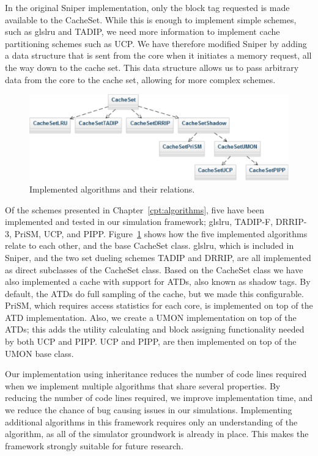 In the original Sniper implementation, only the block tag requested is made available to the CacheSet. 
While this is enough to implement simple schemes, such as gls{lru} and TADIP, we need more information to implement cache partitioning schemes such as UCP.
We have therefore modified Sniper by adding a data structure that is sent from the core when it initiates a memory request, all the way down to the cache set.
This data structure allows us to pass arbitrary data from the core to the cache set, allowing for more complex schemes.

\begin{figure}[ht]
\centering
\includegraphics[scale=0.7]{figures/framework/algorithms}
\caption{Implemented algorithms and their relations.}
\label{fig:framework:implementation:algorithms}
\end{figure}

Of the schemes presented in Chapter~\ref{cpt:algorithms}, five have been implemented and tested in our simulation framework; gls{lru}, TADIP-F, DRRIP-3, PriSM, UCP, and PIPP.
Figure~\ref{fig:framework:implementation:algorithms} shows how the five implemented algorithms relate to each other, and the base CacheSet class.
gls{lru}, which is included in Sniper, and the two set dueling schemes TADIP and DRRIP, are all implemented as direct subclasses of the CacheSet class.
Based on the CacheSet class we have also implemented a cache with support for ATDs, also known as shadow tags.
By default, the ATDs do full sampling of the cache, but we made this configurable.
PriSM, which requires access statistics for each core, is implemented on top of the ATD implementation.
Also, we create a UMON implementation on top of the ATDs; this adds the utility calculating and block assigning functionality needed by both UCP and PIPP.
UCP and PIPP, are then implemented on top of the UMON base class.

Our implementation using inheritance reduces the number of code lines required when we implement multiple algorithms that share several properties.
By reducing the number of code lines required, we improve implementation time, and we reduce the chance of bug causing issues in our simulations.
Implementing additional algorithms in this framework requires only an understanding of the algorithm, as all of the simulator groundwork is already in place.
This makes the framework strongly suitable for future research.